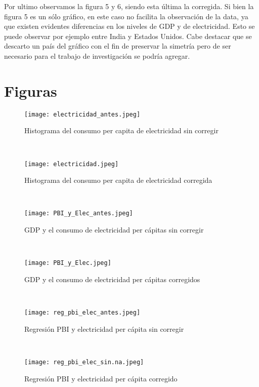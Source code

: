 \documentclass{article}
\begin{document}
Por ultimo observamos la figura 5 y 6, siendo esta última la corregida. Si bien la figura 5 es un sólo gráfico, en este caso no  facilita la observación de la data, ya que existen evidentes diferencias en los niveles de GDP y de electricidad. Esto se puede observar por ejemplo entre India y Estados Unidos. Cabe destacar que se descarto un país del gráfico con el fin de preservar la simetría pero de ser necesario para el trabajo de investigación se podría agregar.\\  






\section{Figuras}

\begin{figure}[htbp]
\centerline{\texttt{[image: electricidad\_antes.jpeg]}}
\caption{Histograma del consumo per capita de electricidad sin corregir}
\label{fig}
\end{figure}\\



\begin{figure}[htbp]
\centerline{\texttt{[image: electricidad.jpeg]}}
\caption{Histograma del consumo per capita de electricidad corregida}
\label{fig}
\end{figure}\\



\begin{figure}[htbp]
\centerline{\texttt{[image: PBI\_y\_Elec\_antes.jpeg]}}
\caption{GDP y el consumo de electricidad per cápitas sin corregir}
\label{fig}
\end{figure}\\



\begin{figure}[htbp]
\centerline{\texttt{[image: PBI\_y\_Elec.jpeg]}}
\caption{GDP y el consumo de electricidad per cápitas corregidos}
\label{fig}
\end{figure}\\




\begin{figure}[htbp]
\centerline{\texttt{[image: reg\_pbi\_elec\_antes.jpeg]}}
\caption{Regresión PBI  y electricidad per cápita sin corregir}
\label{fig}
\end{figure}\\



\begin{figure}[htbp]
\centerline{\texttt{[image: reg\_pbi\_elec\_sin.na.jpeg]}}
\caption{Regresión PBI  y electricidad per cápita corregido}
\label{fig}
\end{figure}\\











\maketitle
\end{document}
